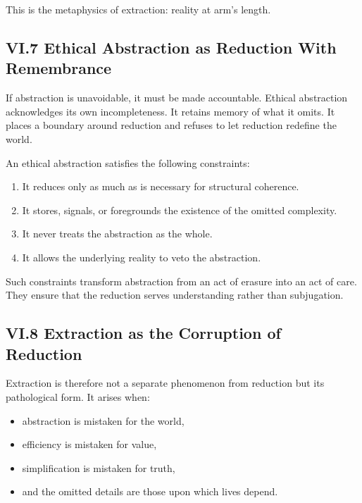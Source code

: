 \documentclass[12pt,letterpaper]{article}
\begin{document}
This is the metaphysics of extraction: reality at arm’s length.

\subsection{VI.7 Ethical Abstraction as Reduction With Remembrance}

If abstraction is unavoidable, it must be made accountable. Ethical abstraction acknowledges its own incompleteness. It retains memory of what it omits. It places a boundary around reduction and refuses to let reduction redefine the world.

An ethical abstraction satisfies the following constraints:

\begin{enumerate}
    \item It reduces only as much as is necessary for structural coherence.
    \item It stores, signals, or foregrounds the existence of the omitted complexity.
    \item It never treats the abstraction as the whole.
    \item It allows the underlying reality to veto the abstraction.
\end{enumerate}

Such constraints transform abstraction from an act of erasure into an act of care. They ensure that the reduction serves understanding rather than subjugation.

\subsection{VI.8 Extraction as the Corruption of Reduction}

Extraction is therefore not a separate phenomenon from reduction but its pathological form. It arises when:

\begin{itemize}
    \item abstraction is mistaken for the world,
    \item efficiency is mistaken for value,
    \item simplification is mistaken for truth,
    \item and the omitted details are those upon which lives depend.
\end{itemize}
\end{document}
